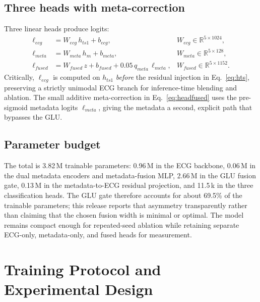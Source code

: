 \documentclass[mathematics,article,submit,pdftex]{Definitions/mdpi}
\def\mathrm#1{#1}%
\def\mathbf#1{#1}%
\def\bm#1{#1}%
\begin{document}
\subsection{Three heads with meta-correction}
Three linear heads produce logits:
\begin{align}
\bm{\ell}_{\mathrm{ecg}}   &= \mathbf{W}_{\mathrm{ecg}}\,\mathbf{h}_{\mathrm{ts1}} + \mathbf{b}_{\mathrm{ecg}}, &\mathbf{W}_{\mathrm{ecg}}\in\mathbb{R}^{5\times 1024}, \\
\bm{\ell}_{\mathrm{meta}}  &= \mathbf{W}_{\mathrm{meta}}\,\mathbf{h}_{\mathrm{m}} + \mathbf{b}_{\mathrm{meta}}, &\mathbf{W}_{\mathrm{meta}}\in\mathbb{R}^{5\times 128}, \\
\bm{\ell}_{\mathrm{fused}} &= \mathbf{W}_{\mathrm{fused}}\,\mathbf{z} + \mathbf{b}_{\mathrm{fused}} + 0.05\,q_{\mathrm{meta}}\,\bm{\ell}_{\mathrm{meta}}, &\mathbf{W}_{\mathrm{fused}}\in\mathbb{R}^{5\times 1152}. \label{eq:headfused}
\end{align}
Critically, $\bm{\ell}_{\mathrm{ecg}}$ is computed on $\mathbf{h}_{\mathrm{ts1}}$ \emph{before} the residual injection in Eq.~\eqref{eq:hts}, preserving a strictly unimodal ECG branch for inference-time blending and ablation. The small additive meta-correction in Eq.~\eqref{eq:headfused} uses the pre-sigmoid metadata logits $\bm{\ell}_{\mathrm{meta}}$, giving the metadata a second, explicit path that bypasses the GLU.

\subsection{Parameter budget}
The total is 3.82\,M trainable parameters: 0.96\,M in the ECG backbone, 0.06\,M in the dual metadata encoders and metadata-fusion MLP, 2.66\,M in the GLU fusion gate, 0.13\,M in the metadata-to-ECG residual projection, and 11.5\,k in the three classification heads. The GLU gate therefore accounts for about 69.5\% of the trainable parameters; this release reports that asymmetry transparently rather than claiming that the chosen fusion width is minimal or optimal. The model remains compact enough for repeated-seed ablation while retaining separate ECG-only, metadata-only, and fused heads for measurement.

\section{Training Protocol and Experimental Design}\label{sec:protocol}
\end{document}
